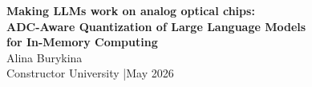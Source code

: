 \begin{frame}
  \centering
  \vspace{1.2em}
  {\Large\bfseries\color{mybluedark}
    Making LLMs work on analog optical chips: }\\[1.0em]
  {\normalsize\bfseries\color{mybluedark}
    ADC-Aware Quantization of Large Language Models\\
    for In-Memory Computing}\\[1.0em]
  \vspace{1.2em}
  {\normalsize Alina Burykina}\\[0.2em]
  {\small\color{mygray} Constructor University \quad|\quad May 2026}
\end{frame}
